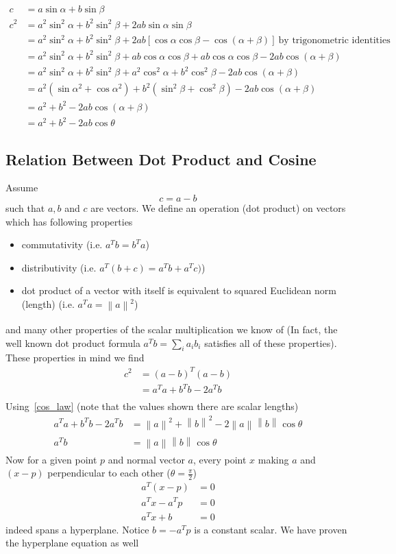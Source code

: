 \documentclass{article}
\newcommand{\norm}[2][]{\left\lVert#2\right\rVert_{#1}}
\numberwithin{equation}{subsection}
\begin{document}
\begin{align}
    c &= a\sin\alpha + b\sin \beta\\
    c^2 &= a^2\sin^2 \alpha + b^2\sin^2 \beta + 2ab\sin\alpha\sin \beta\\
     &= a^2\sin^2 \alpha + b^2\sin^2 \beta + 2ab[\cos \alpha\cos\beta - \cos(\alpha +\beta)]\ \text{by trigonometric identities}\\
     &= a^2\sin^2 \alpha + b^2\sin^2 \beta + ab\cos \alpha\cos\beta + ab\cos \alpha\cos\beta - 2ab\cos(\alpha +\beta)\\
     &= a^2\sin^2 \alpha + b^2\sin^2 \beta + a^2\cos^2 \alpha + b^2\cos^2 \beta - 2ab\cos(\alpha +\beta)\\
     &= a^2(\sin\alpha^2 + \cos \alpha^2) + b^2(\sin^2 \beta + \cos^2 \beta) - 2ab\cos(\alpha +\beta)\\
     &= a^2 + b^2 - 2ab\cos(\alpha +\beta)\\
     &= a^2 + b^2 - 2ab\cos \theta \label{cos_law}
\end{align}
\subsection{Relation Between Dot Product and Cosine}
Assume
\begin{equation}
    c = a-b
\end{equation}
such that $a, b$ and $c$ are vectors. We define an operation (dot product) on vectors which has following properties

\begin{itemize}
    \item commutativity (i.e. $a^Tb = b^Ta$)
    \item distributivity (i.e. $a^T(b+c) = a^Tb+a^Tc)$)
    \item dot product of a vector with itself is equivalent to squared Euclidean norm (length) (i.e. $a^Ta = \norm{a}^2$)
\end{itemize}
and many other properties of the scalar multiplication we know of (In fact, the well known dot product formula $a^Tb = \sum_i a_i b_i$ satisfies all of these properties).
These properties in mind we find
\begin{align}
    c^2 &= (a-b)^T(a-b)\\
    &= a^Ta +b^Tb - 2a^Tb\\
\end{align}
Using~\ref{cos_law} (note that the values shown there are scalar lengths)
\begin{align}
    a^Ta +b^Tb - 2a^Tb &= \norm{a}^2 + \norm{b}^2 - 2\norm{a}\norm{b}\cos \theta\\
    a^Tb &= \norm{a}\norm{b}\cos \theta
\end{align}
Now for a given point $p$ and normal vector $a$, every point $x$ making $a$ and $(x-p)$ perpendicular to each other ($\theta = \frac{\pi}{2}$) 
\begin{align}
    a^T(x-p) &= 0\\
    a^Tx-a^Tp &= 0\\
    a^Tx+b &= 0
\end{align}
indeed spans a hyperplane. Notice $b = -a^Tp$ is a constant scalar. We have proven the hyperplane equation as well
\end{document}

